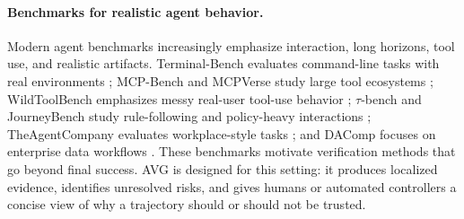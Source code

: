 \documentclass{article} %
\newcommand{\AVG}{\textsc{AVG}\xspace}
\begin{document}
\paragraph{Benchmarks for realistic agent behavior.}
Modern agent benchmarks increasingly emphasize interaction, long horizons, tool use, and realistic artifacts. Terminal-Bench evaluates command-line tasks with real environments \citep{merrill2026terminalbench}; MCP-Bench and MCPVerse study large tool ecosystems \citep{wang2025mcpbench,lei2026mcpverse}; WildToolBench emphasizes messy real-user tool-use behavior \citep{yu2026wildtoolbench}; $\tau$-bench and JourneyBench study rule-following and policy-heavy interactions \citep{yao2025taubench,balaji2026journeybench}; TheAgentCompany evaluates workplace-style tasks \citep{xu2024theagentcompany}; and DAComp focuses on enterprise data workflows \citep{lei2026dacomp}. These benchmarks motivate verification methods that go beyond final success. \AVG is designed for this setting: it produces localized evidence, identifies unresolved risks, and gives humans or automated controllers a concise view of why a trajectory should or should not be trusted.




\end{document}
